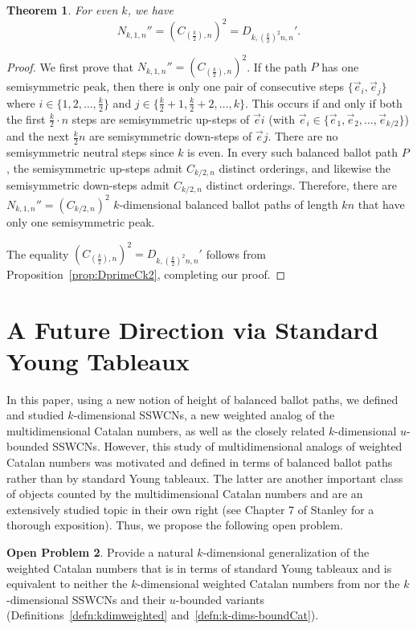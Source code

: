 \documentclass[11pt]{article}
\newtheorem{theorem}{Theorem}[section]
\theoremstyle{remark}
\theoremstyle{definition}
\newtheorem{openproblem}[theorem]{Open Problem}
\begin{document}
\begin{theorem}\label{thm:RelatingTheTriangles}
For even $k$, we have $$N_{k,1,n}'' = ({C}_{\left(\frac{k}{2}\right),n})^2 = D_{k, \left(\frac{k}{2}\right)^2 n, n}'.$$
\end{theorem}
\begin{proof}
We first prove that $N_{k,1,n}'' = ({C}_{\left(\frac{k}{2}\right),n})^2$. If the path $P$ has one semisymmetric peak, then there is only one pair of consecutive steps $\{\vec{e}_i,\vec{e}_j\}$ where $i \in \{1, 2, \dots, \frac{k}{2}\}$ and $j \in \{\frac{k}{2}+1,\frac{k}{2}+2, \dots, k\}$. This occurs if and only if both the first $\frac{k}{2} \cdot n$ steps are semisymmetric up-steps of $\vec{e}i$ (with $\vec{e}_i \in \{ \vec{e}_1, \vec{e}_2, \ldots, \vec{e}_{k/2} \}$) and the next $\frac{k}{2}n$ are semisymmetric down-steps of $\vec{e}j$. There are no semisymmetric neutral steps since $k$ is even. In every such balanced ballot path $P$, the semisymmetric up-steps admit $C_{k/2,n}$ distinct orderings, and likewise the semisymmetric down-steps admit $C_{k/2,n}$ distinct orderings. Therefore, there are $N_{k,1,n}'' = (C_{k/2,n})^2$ $k$-dimensional balanced ballot paths of length $kn$ that have only one semisymmetric peak.

The equality $({C}_{\left(\frac{k}{2}\right),n})^2 = D_{k, \left(\frac{k}{2}\right)^2 n, n}'$ follows from Proposition~\ref{prop:DprimeCk2}, completing our proof.
\end{proof}
\section{A Future Direction via Standard Young Tableaux}\label{sec:FurtherDir}
In this paper, using a new notion of height of balanced ballot paths, we defined and studied $k$-dimensional SSWCNs, a new weighted analog of the multidimensional Catalan numbers, as well as the closely related $k$-dimensional $u$-bounded SSWCNs. However, this study of multidimensional analogs of weighted Catalan numbers was motivated and defined in terms of balanced ballot paths rather than by standard Young tableaux. The latter are another important class of objects counted by the multidimensional Catalan numbers and are an extensively studied topic in their own right (see Chapter 7 of Stanley \cite{MR4621625} for a thorough exposition). Thus, we propose the following open problem.

\begin{openproblem}\label{op:probl1}
Provide a natural $k$-dimensional generalization of the weighted Catalan numbers that is in terms of standard Young tableaux and is equivalent to neither the $k$-dimensional weighted Catalan numbers from \cite{MR5034574} nor the  $k$-dimensional SSWCNs and their $u$-bounded variants (Definitions~\ref{defn:kdimweighted} and~\ref{defn:k-dims-boundCat}).
\end{openproblem}
\end{document}
